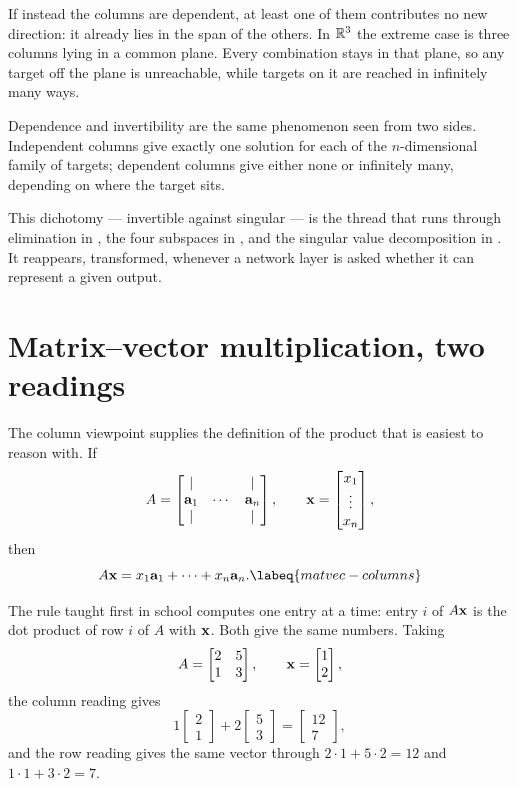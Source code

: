 If instead the columns are dependent, at least one of them contributes no new
direction: it already lies in the span of the others. In \(\mathbb{R}^{3}\) the extreme
case is three columns lying in a common plane. Every combination stays in that
plane, so any target off the plane is unreachable, while targets on it are
reached in infinitely many ways.

\begin{remark}
Dependence and invertibility are the same phenomenon seen from two sides.
Independent columns give exactly one solution for each of the \(n\)-dimensional
family of targets; dependent columns give either none or infinitely many,
depending on where the target sits.
\end{remark}

This dichotomy --- invertible against singular --- is the thread that runs
through elimination in , the four subspaces in
, and the singular value decomposition in . It
reappears, transformed, whenever a network layer is asked whether it can
represent a given output.

\section{Matrix--vector multiplication, two readings}

The column viewpoint supplies the definition of the product that is easiest to
reason with. If
\[
	A=\begin{bmatrix}\vert&&\vert\\ \mathbf{a}_1&\cdots&\mathbf{a}_n\\ \vert&&\vert\end{bmatrix},
	\qquad
	\mathbf{x}=\begin{bmatrix}x_1\\\vdots\\x_n\end{bmatrix},
\]
then
\begin{equation}
	A\vect{x}=x_1\vect{a}_1+\cdots+x_n\vect{a}_n .
	\labeq{matvec-columns}
\end{equation}

The rule taught first in school computes one entry at a time: entry \(i\) of
\(A\mathbf{x}\) is the dot product of row \(i\) of \(A\) with \(\mathbf{x}\). Both
give the same numbers. Taking
\[
	A=\begin{bmatrix}2&5\\1&3\end{bmatrix},\qquad
	\mathbf{x}=\begin{bmatrix}1\\2\end{bmatrix},
\]
the column reading gives
\[
	1\begin{bmatrix}2\\1\end{bmatrix}+2\begin{bmatrix}5\\3\end{bmatrix}
	=\begin{bmatrix}12\\7\end{bmatrix},
\]
and the row reading gives the same vector through \(2\cdot1+5\cdot2=12\) and
\(1\cdot1+3\cdot2=7\).

